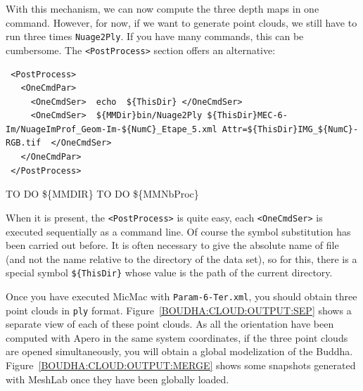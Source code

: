 With this mechanism, we can now compute the three depth maps in one command.
However, for now, if we want to generate point clouds, we still have to run three
times {\tt Nuage2Ply}. If you have many commands, this can be cumbersome. The
{\tt <PostProcess>} section offers an alternative:


{\scriptsize
\begin{verbatim}
 <PostProcess>
   <OneCmdPar>
     <OneCmdSer>  echo  ${ThisDir} </OneCmdSer>
     <OneCmdSer>  ${MMDir}bin/Nuage2Ply ${ThisDir}MEC-6-Im/NuageImProf_Geom-Im-${NumC}_Etape_5.xml Attr=${ThisDir}IMG_${NumC}-RGB.tif  </OneCmdSer>
   </OneCmdPar>
 </PostProcess>

\end{verbatim}
}

TO DO \$\{MMDIR\}
TO DO \$\{MMNbProc\}

When it is present, the {\tt <PostProcess>} is quite easy, each {\tt <OneCmdSer>} is
executed sequentially as a command line. Of course the symbol substitution has been carried out
before. It is often necessary to give the absolute name of file (and not the name relative to
the directory of the data set), so for this, there is a special symbol {\tt \$\{ThisDir\}} whose
value is the path of the current directory.

Once you have executed MicMac with {\tt Param-6-Ter.xml}, you should obtain
three point clouds in {\tt ply} format.
Figure~\ref{BOUDHA:CLOUD:OUTPUT:SEP} shows a separate view of
each of these point clouds.
As all the orientation have been computed with Apero in the same system
coordinates, if the three point clouds are opened simultaneously, you will obtain
a global modelization of the Buddha.  Figure~\ref{BOUDHA:CLOUD:OUTPUT:MERGE}
shows some snapshots generated with MeshLab once they have been globally loaded.

